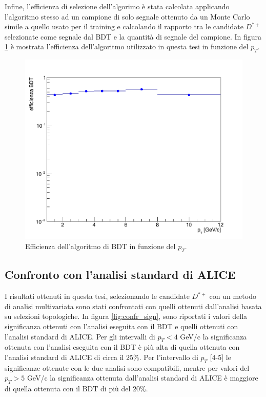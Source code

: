 Infine, l'efficienza di selezione dell'algorimo \`e stata calcolata applicando l'algoritmo stesso ad un campione di solo segnale ottenuto da un Monte Carlo simile a quello usato per il training e calcolando il rapporto tra le candidate $D^{*+}$ selezionate come segnale dal BDT e la quantit\`a di segnale del campione.
In figura \ref{fig:efficienza_BDT} \`e mostrata l'efficienza dell'algoritmo utilizzato in questa tesi in funzione del $p_T$.

\begin{figure}[htbp] 
        \centering
        \includegraphics[width=0.8\linewidth]{AnalisiDati/eff_BDT.png}
        \caption{Efficienza dell'algoritmo di BDT in funzione del $p_T$.}
        \label{fig:efficienza_BDT}
    \end{figure}
    
\newpage
\subsection{Confronto con l'analisi standard di ALICE}    

I risultati ottenuti in questa tesi, selezionando le candidate $D^{*+}$ con un metodo di analisi multivariata sono stati confrontati con quelli ottenuti dall'analisi basata su selezioni topologiche\cite{dati_ALICE}.
In figura \ref{fig:confr_sign}, sono riportati i valori della significanza ottenuti con l'analisi eseguita con il BDT e quelli ottenuti con l'analisi standard di ALICE. Per gli intervalli di $p_T < 4$ GeV/c la significanza ottenuta con l'analisi eseguita con il BDT è più alta di quella ottenuta con l'analisi standard di ALICE di circa il $25\%$. Per l'intervallo di $p_T$ [4-5] le significanze ottenute con le due analisi sono compatibili, mentre per valori del  $p_T > 5$ GeV/c la significanza ottenuta dall'analisi standard di ALICE \`e maggiore di quella ottenuta con il BDT di pi\`u del $20\%$. 

